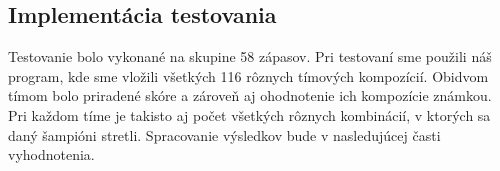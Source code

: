 \subsection{Implementácia testovania}
Testovanie bolo vykonané na skupine 58 zápasov. Pri testovaní sme použili náš program, kde sme vložili všetkých 116 rôznych tímových kompozícií. Obidvom tímom bolo priradené skóre a zároveň aj ohodnotenie ich kompozície známkou. Pri každom tíme je takisto aj počet všetkých rôznych kombinácií, v ktorých sa daný šampióni stretli. Spracovanie výsledkov bude v nasledujúcej časti vyhodnotenia.
